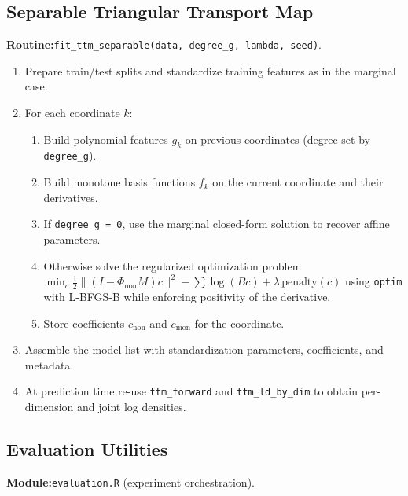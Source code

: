 \documentclass[11pt,a4paper,twoside]{book}\usepackage[]{graphicx}\usepackage[]{xcolor}
\begin{document}
\subsection{Separable Triangular Transport Map}\label{app:ttm-sep}

\textbf{Routine:}\quad\texttt{fit\_ttm\_separable(data, degree\_g, lambda, seed)}.

\begin{enumerate}
 \item Prepare train/test splits and standardize training features as in the marginal case.
 \item For each coordinate $k$:
 \begin{enumerate}
 \item Build polynomial features $g_k$ on previous coordinates (degree set by \texttt{degree\_g}).
 \item Build monotone basis functions $f_k$ on the current coordinate and their derivatives.
 \item If \texttt{degree\_g = 0}, use the marginal closed-form solution to recover affine parameters.
 \item Otherwise solve the regularized optimization problem
 $\min_c \frac{1}{2}\lVert (I - \Phi_{\text{non}} M)c \rVert^2 - \sum \log (B c) + \lambda\,\text{penalty}(c)$
 using \texttt{optim} with L-BFGS-B while enforcing positivity of the derivative.
 \item Store coefficients $c_{\text{non}}$ and $c_{\text{mon}}$ for the coordinate.
 \end{enumerate}
 \item Assemble the model list with standardization parameters, coefficients, and metadata.
 \item At prediction time re-use \texttt{ttm\_forward} and \texttt{ttm\_ld\_by\_dim} to obtain per-dimension and joint log densities.
\end{enumerate}

\subsection{Evaluation Utilities}\label{app:evaluation}

\textbf{Module:}\quad\texttt{evaluation.R} (experiment orchestration).
\end{document}
